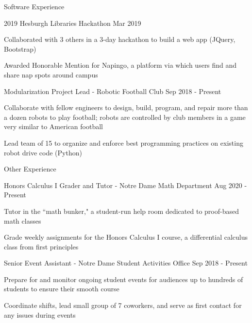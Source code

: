 \documentclass[10pt]{resume} %
\begin{document}
\begin{rSection}{ Software Experience }
\begin{rSubsection}{ 2019 Hesburgh Libraries Hackathon }{ Mar 2019 }{}{}
\item Collaborated with 3 others in a 3-day hackathon to build a web app (JQuery, Bootstrap)
\item Awarded Honorable Mention for Napingo, a platform via which users find and share nap spots around campus
\end{rSubsection}

\begin{rSubsection}{ Modularization Project Lead - Robotic Football Club }{ Sep 2018 - Present }{}{}
\item Collaborate with fellow engineers to design, build, program, and repair more than a dozen robots to play football; robots are controlled by club members in a game very similar to American football
\item Lead team of 15 to organize and enforce best programming practices on existing robot drive code (Python)
\end{rSubsection}

\end{rSection}


\begin{rSection}{Other Experience}

\begin{rSubsection}{ Honors Calculus I Grader and Tutor - Notre Dame Math Department }{ Aug 2020 - Present }{}{}
\item Tutor in the ``math bunker," a student-run help room dedicated to proof-based math classes
\item Grade weekly assignments for the Honors Calculus I course, a differential calculus class from first principles
\end{rSubsection}


\begin{rSubsection}{ Senior Event Assistant - Notre Dame Student Activities Office }{ Sep 2018 - Present }{}{}
\item Prepare for and monitor ongoing student events for audiences up to hundreds of students to ensure their smooth course
\item Coordinate shifts, lead small group of 7 coworkers, and serve as first contact for any issues during events
\end{rSubsection}

\end{rSection}
\end{document}
